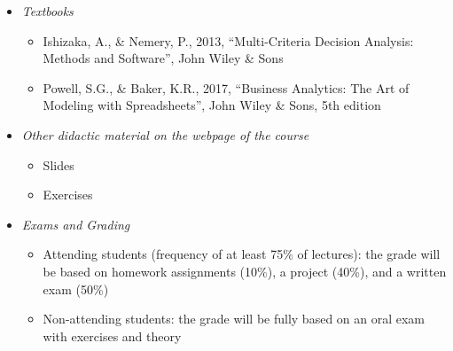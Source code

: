 \documentclass[trans]{beamer}
\newenvironment{stepitemize}{\begin{itemize}[<+->]}{\end{itemize} }
\begin{document}
\begin{frame}%



%

\begin{stepitemize}
\item \textit{Textbooks}

\begin{stepitemize}
\item Ishizaka, A., \& Nemery, P., 2013, \textquotedblleft Multi-Criteria
Decision Analysis: Methods and Software\textquotedblright , John Wiley \&
Sons

\item Powell, S.G., \& Baker, K.R., 2017, \textquotedblleft Business
Analytics: The Art of Modeling with Spreadsheets\textquotedblright , John
Wiley \& Sons, 5th edition
\end{stepitemize}

\item \textit{Other didactic material on the webpage of the course}

\begin{stepitemize}
\item Slides

\item Exercises
\end{stepitemize}

\item \textit{Exams and Grading}

\begin{stepitemize}
\item Attending students (frequency of at least 75\% of lectures): the grade
will be based on homework assignments (10\%), a project (40\%), and a
written exam (50\%)

\item Non-attending students: the grade will be fully based on an oral exam
with exercises and theory
\end{stepitemize}
\end{stepitemize}

\transboxout%
\end{frame}%
\end{document}
